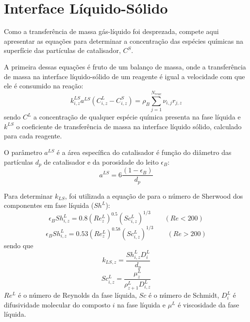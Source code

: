 \section{Interface Líquido-Sólido} \label{sec:interfaceliquidosolido}

Como a transferência de massa gás-líquido foi desprezada, compete aqui
apresentar as equações para determinar a concentração das espécies químicas
na superfície das partículas de catalisador, $C^S$. 

A primeira dessas equações é fruto de um balanço de massa, onde a
transferência de massa na interface líquido-sólido de um reagente é igual a
velocidade com que ele é consumido na reação:
\begin{equation}
k_{i,z}^{LS}a^{LS}(C^L_{i,z}-C^S_{i,z}) = \rho_B
\displaystyle\sum_{j=1}^{N_{reac}}
\nu_{i,j}r_{j,z}
\label{eq:transferenciamassa}
\end{equation}
sendo $C^{L}$ a concentração de qualquer espécie química presenta na fase
líquida e $k^{LS}$ o coeficiente de transferência de massa na interface líquido
sólido, calculado para cada reagente.


O parâmetro $a^{LS}$ é a área específica do catalisador é função do diâmetro
das partículas $d_p$ de catalisador e da porosidade do leito $\epsilon_B$:
\begin{equation}
a^{LS} = 6 \dfrac{(1-\epsilon_B)}{d_p}
\label{eq:aLS}
\end{equation}


Para determinar $k_{LS}$, foi utilizada a equação de 
para o número de Sherwood dos componentes em fase líquida ($Sh^L$):
\begin{equation}
\epsilon_BSh^L_{i,z} = 0.8(Re^L_z)^{0.5}(Sc^L_{i,z})^{1/3} \qquad (Re<200)
\label{eq:Sh1}
\end{equation}
\begin{equation}
\epsilon_BSh^L_{i,z} = 0.53(Re^L_z)^{0.58}(Sc^L_{i,z})^{1/3} \qquad (Re>200)
\label{eq:Sh2}
\end{equation}
sendo que
\begin{equation}
k_{LS,z} = \dfrac{Sh^L_{i,z}D^L_{i}}{d_p}
\label{eq:kLS}
\end{equation}
\begin{equation} 
Sc^L_{i,z} = \dfrac{\mu^L_{z}}{\rho^L_{z+1}D^L_{i,z}}
\label{eq:Sc}
\end{equation}
$Re^L$ é o número de Reynolds da fase líquida, $Sc$ é o número de Schmidt,
$D^L_{i}$ é difusividade molecular do composto $i$ na fase líquida e $\mu^L$ é
viscosidade da fase líquida.

